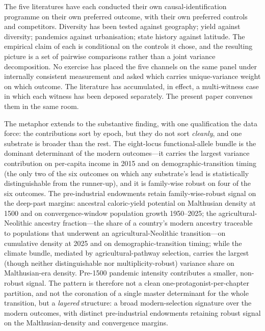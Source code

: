\documentclass[11pt,letterpaper]{article}
\begin{document}
The five literatures have each conducted their own causal-identification programme on their own preferred outcome, with their own preferred controls and competitors. Diversity has been tested against geography; yield against diversity; pandemics against urbanisation; state history against latitude. The empirical claim of each is conditional on the controls it chose, and the resulting picture is a set of pairwise comparisons rather than a joint variance decomposition. No exercise has placed the five channels on the same panel under internally consistent measurement and asked which carries unique-variance weight on which outcome. The literature has accumulated, in effect, a multi-witness case in which each witness has been deposed separately. The present paper convenes them in the same room.

The metaphor extends to the substantive finding, with one qualification the data force: the contributions sort by epoch, but they do not sort \emph{cleanly}, and one substrate is broader than the rest. The eight-locus functional-allele bundle is the dominant determinant of the modern outcomes---it carries the largest variance contribution on per-capita income in 2015 and on demographic-transition timing (the only two of the six outcomes on which any substrate's lead is statistically distinguishable from the runner-up), and it is family-wise robust on four of the six outcomes. The pre-industrial endowments retain family-wise-robust signal on the deep-past margins: ancestral caloric-yield potential on Malthusian density at 1500 and on convergence-window population growth 1950--2025; the agricultural-Neolithic ancestry fraction---the share of a country's modern ancestry traceable to populations that underwent an agricultural-Neolithic transition---on cumulative density at 2025 and on demographic-transition timing; while the climate bundle, mediated by agricultural-pathway selection, carries the largest (though neither distinguishable nor multiplicity-robust) variance share on Malthusian-era density. Pre-1500 pandemic intensity contributes a smaller, non-robust signal. The pattern is therefore not a clean one-protagonist-per-chapter partition, and not the coronation of a single master determinant for the whole transition, but a \emph{layered} structure: a broad modern-selection signature over the modern outcomes, with distinct pre-industrial endowments retaining robust signal on the Malthusian-density and convergence margins.
\end{document}

